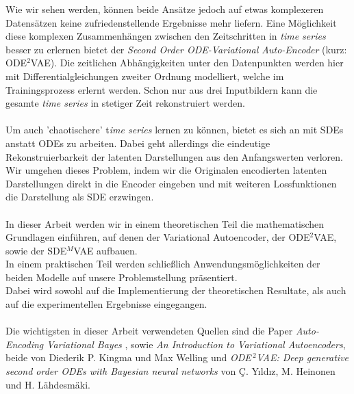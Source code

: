 \documentclass[12pt]{article}
\begin{document}
	Wie wir sehen werden, können beide Ansätze jedoch auf etwas komplexeren Datensätzen keine zufriedenstellende Ergebnisse mehr liefern.
	Eine Möglichkeit diese komplexen Zusammenhängen zwischen den Zeitschritten in \emph{time series} besser zu erlernen bietet der \emph{Second Order ODE-Variational Auto-Encoder} (kurz: ODE$^2$VAE). Die zeitlichen Abhängigkeiten unter den Datenpunkten werden hier mit Differentialgleichungen zweiter Ordnung modelliert, welche im Trainingsprozess erlernt werden. Schon nur aus drei Inputbildern kann die gesamte \emph{time series} in stetiger Zeit rekonstruiert werden.\\ \\
	Um auch 'chaotischere' t\emph{ime series} lernen zu können, bietet es sich an mit SDEs anstatt ODEs zu arbeiten. Dabei geht allerdings die eindeutige Rekonstruierbarkeit der latenten Darstellungen aus den Anfangswerten verloren. Wir umgehen dieses Problem, indem wir die Originalen encodierten latenten Darstellungen direkt in die Encoder eingeben und mit weiteren Lossfunktionen die Darstellung als SDE erzwingen.
	\\
	\\
	In dieser Arbeit werden wir in einem theoretischen Teil die mathematischen Grundlagen einführen, auf denen der Variational Autoencoder, der ODE$^2$VAE, sowie der SDE$^M$VAE aufbauen.\\
	In einem praktischen Teil werden schließlich Anwendungsmöglichkeiten der beiden Modelle auf unsere Problemstellung präsentiert.\\
	Dabei wird sowohl auf die Implementierung der
	theoretischen Resultate, als auch auf die experimentellen Ergebnisse eingegangen.\\ \\
	Die wichtigsten in dieser Arbeit verwendeten Quellen sind die Paper \emph{Auto-Encoding Variational Bayes} \cite{vae}, sowie \emph{An Introduction to Variational Autoencoders}, \cite{intvae} beide von Diederik P. Kingma und Max Welling und \emph{ODE$^{\ 2}$VAE: Deep generative second order ODEs with Bayesian neural networks} \cite{ode2vae} von Ç. Yıldız, M. Heinonen und H. Lähdesmäki.
	\newpage
\end{document}
